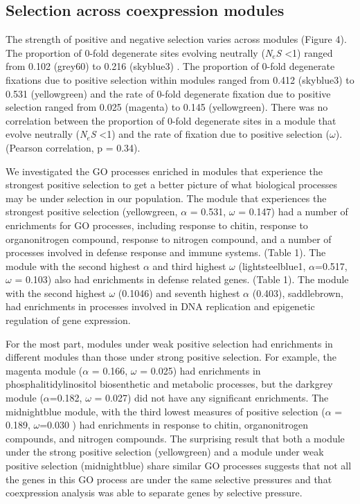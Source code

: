 \subsection{Selection across coexpression modules}
The strength of positive and negative selection varies across modules (Figure 4). The proportion of 0-fold degenerate sites evolving neutrally (\textit{N$_{e}$S} \textless 1) ranged from 0.102 (grey60) to 0.216 (skyblue3) . The proportion of 0-fold degenerate fixations due to positive selection within modules ranged from  0.412 (skyblue3) to 0.531 (yellowgreen) and the rate of 0-fold degenerate fixation due to positive selection ranged from 0.025 (magenta) to 0.145 (yellowgreen). There was no correlation between the proportion of 0-fold degenerate sites in a module that evolve neutrally (\textit{N$_{e}$S} \textless 1) and the rate of fixation due to positive selection ($\omega$). (Pearson correlation, p = 0.34). 

We investigated the GO processes enriched in modules that experience the strongest positive selection to get a better picture of what biological processes may be under selection in our population. The module that experiences the strongest positive selection (yellowgreen, $\alpha$ = 0.531, $\omega$ = 0.147) had a number of enrichments for GO processes, including response to chitin, response to organonitrogen compound, response to nitrogen compound, and a number of processes involved in defense response and immune systems. (Table 1). The module with the second highest $\alpha$ and third highest $\omega$ (lightsteelblue1, $\alpha$=0.517, $\omega$ = 0.103) also had enrichments in defense related genes. (Table 1).  The module with the second highest $\omega$ (0.1046) and seventh highest $\alpha$ (0.403), saddlebrown, had enrichments in processes involved in DNA replication and epigenetic regulation of gene expression.

For the most part, modules under weak positive selection had enrichments in different modules than those under strong positive selection. For example, the magenta module ($\alpha$ = 0.166, $\omega$ = 0.025) had enrichments in phosphalitidylinositol biosenthetic and metabolic processes, but the darkgrey module ($\alpha$=0.182, $\omega$ = 0.027) did not have any significant enrichments. The midnightblue module, with the third lowest measures of positive selection ($\alpha$ = 0.189, $\omega$=0.030 ) had enrichments in response to chitin, organonitrogen compounds, and nitrogen compounds. The surprising result that both a module under the strong positive selection (yellowgreen) and a module under weak positive selection (midnightblue) share similar GO processes suggests that not all the genes in this GO process are under the same selective pressures and that coexpression analysis was able to separate genes by selective pressure.


